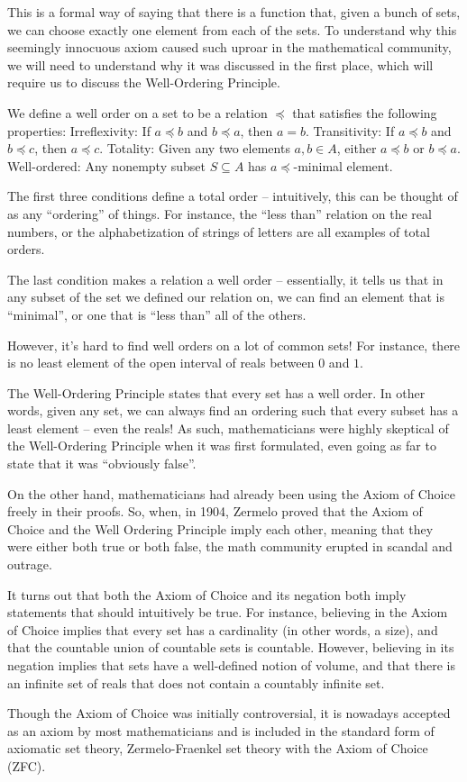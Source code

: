 \documentclass{article}
\begin{document}
This is a formal way of saying that there is a function that, given a bunch of sets, we can choose exactly one element from each of the sets. To understand why this seemingly innocuous axiom caused such uproar in the mathematical community, we will need to understand why it was discussed in the first place, which will require us to discuss the Well-Ordering Principle. 

We define a well order on a set to be a relation $\preceq$ that satisfies the following properties:
Irreflexivity: If $a\preceq b$ and $b\preceq a$, then $a=b$.
Transitivity: If $a\preceq b$ and $b\preceq c$, then $a\preceq c$.
Totality: Given any two elements $a, b \in A$, either $a \preceq b$ or $b \preceq a$.
Well-ordered: Any nonempty subset $S\subseteq A$ has $a \preceq$-minimal element.

The first three conditions define a total order – intuitively, this can be thought of as any “ordering” of things. For instance, the “less than” relation on the real numbers, or the alphabetization of strings of letters are all examples of total orders. 

The last condition makes a relation a well order – essentially, it tells us that in any subset of the set we defined our relation on, we can find an element that is “minimal”, or one that is “less than” all of the others.

However, it’s hard to find well orders on a lot of common sets! For instance, there is no least element of the open interval of reals between $0$ and $1$. 

The Well-Ordering Principle states that every set has a well order. In other words, given any set, we can always find an ordering such that every subset has a least element – even the reals! As such, mathematicians were highly skeptical of the Well-Ordering Principle when it was first formulated, even going as far to state that it was “obviously false”.

On the other hand, mathematicians had already been using the Axiom of Choice freely in their proofs. So, when, in 1904, Zermelo proved that the Axiom of Choice and the Well Ordering Principle imply each other, meaning that they were either both true or both false, the math community erupted in scandal and outrage. 

It turns out that both the Axiom of Choice and its negation both imply statements that should intuitively be true. For instance, believing in the Axiom of Choice implies that every set has a cardinality (in other words, a size), and that the countable union of countable sets is countable. However, believing in its negation implies that sets have a well-defined notion of volume, and that there is an infinite set of reals that does not contain a countably infinite set. 

Though the Axiom of Choice was initially controversial, it is nowadays accepted as an axiom by most mathematicians and is included in the standard form of axiomatic set theory, Zermelo-Fraenkel set theory with the Axiom of Choice (ZFC).
\end{document}
